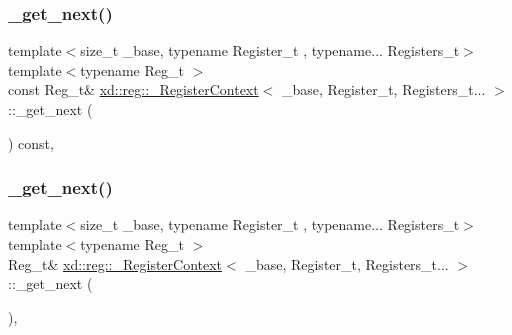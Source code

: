 \subsubsection{\texorpdfstring{\+\_\+get\+\_\+next()}{\_get\_next()}\hspace{0.1cm}{\footnotesize\ttfamily [1/2]}}
{\footnotesize\ttfamily template$<$size\+\_\+t \+\_\+base, typename Register\+\_\+t , typename... Registers\+\_\+t$>$ \\
template$<$typename Reg\+\_\+t $>$ \\
const Reg\+\_\+t\& \mbox{\hyperlink{classxd_1_1reg_1_1___register_context}{xd\+::reg\+::\+\_\+\+Register\+Context}}$<$ \+\_\+base, Register\+\_\+t, Registers\+\_\+t... $>$\+::\+\_\+get\+\_\+next (\begin{DoxyParamCaption}{ }\end{DoxyParamCaption}) const\hspace{0.3cm}{\ttfamily [inline]}, {\ttfamily [protected]}}

\mbox{\label{classxd_1_1reg_1_1___register_context_3_01__base_00_01_register__t_00_01_registers__t_8_8_8_01_4_a006128b54eb90ee09610f8d314755c8b}} 
\subsubsection{\texorpdfstring{\+\_\+get\+\_\+next()}{\_get\_next()}\hspace{0.1cm}{\footnotesize\ttfamily [2/2]}}
{\footnotesize\ttfamily template$<$size\+\_\+t \+\_\+base, typename Register\+\_\+t , typename... Registers\+\_\+t$>$ \\
template$<$typename Reg\+\_\+t $>$ \\
Reg\+\_\+t\& \mbox{\hyperlink{classxd_1_1reg_1_1___register_context}{xd\+::reg\+::\+\_\+\+Register\+Context}}$<$ \+\_\+base, Register\+\_\+t, Registers\+\_\+t... $>$\+::\+\_\+get\+\_\+next (\begin{DoxyParamCaption}{ }\end{DoxyParamCaption})\hspace{0.3cm}{\ttfamily [inline]}, {\ttfamily [protected]}}

